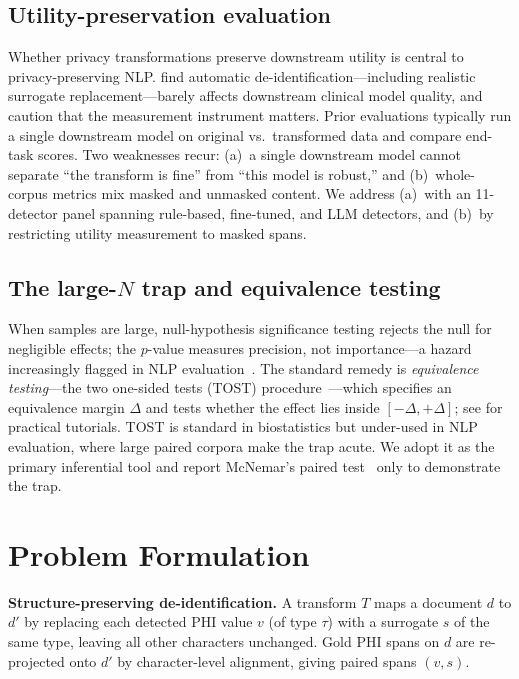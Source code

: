 \documentclass[pmlr,twocolumn,10pt]{jmlr}
\begin{document}
\subsection{Utility-preservation evaluation}
Whether privacy transformations preserve downstream utility is central to privacy-preserving NLP. \citet{vakili2022downstream} find automatic de-identification---including realistic surrogate replacement---barely affects downstream clinical model quality, and \citet{vakili2023mia} caution that the measurement instrument matters. Prior evaluations typically run a single downstream model on original vs.\ transformed data and compare end-task scores. Two weaknesses recur: (a)~a single downstream model cannot separate ``the transform is fine'' from ``this model is robust,'' and (b)~whole-corpus metrics mix masked and unmasked content. We address (a)~with an 11-detector panel spanning rule-based, fine-tuned, and LLM detectors, and (b)~by restricting utility measurement to masked spans.

\subsection{The large-$N$ trap and equivalence testing}
When samples are large, null-hypothesis significance testing rejects the null for negligible effects; the $p$-value measures precision, not importance---a hazard increasingly flagged in NLP evaluation~\citep{dror2018hitchhiker,card2020power}. The standard remedy is \emph{equivalence testing}---the two one-sided tests (TOST) procedure~\citep{schuirmann1987tost,berger1996bioequivalence}---which specifies an equivalence margin $\Delta$ and tests whether the effect lies inside $[-\Delta,+\Delta]$; see \citet{lakens2017tost,lakens2018equivalence} for practical tutorials. TOST is standard in biostatistics but under-used in NLP evaluation, where large paired corpora make the trap acute. We adopt it as the primary inferential tool and report McNemar's paired test~\citep{mcnemar1947} only to demonstrate the trap.

\section{Problem Formulation}
\textbf{Structure-preserving de-identification.} A transform $T$ maps a document $d$ to $d'$ by replacing each detected PHI value $v$ (of type $\tau$) with a surrogate $s$ of the same type, leaving all other characters unchanged. Gold PHI spans on $d$ are re-projected onto $d'$ by character-level alignment, giving paired spans $(v,s)$.
\end{document}

